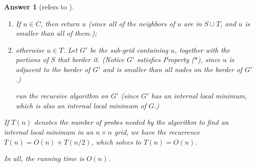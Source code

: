 \documentclass[11pt]{article}
\theoremstyle{numberplain}
\theoremstyle{nonumberplain}
\newtheorem{ans}{Answer}
\def\as{{\ast}}
\newcommand{\0}{{\mathbf{0}}}
\begin{document}
\begin{ans}[refers to \cite{solcornell}]
\begin{code}
\begin{enumerate}
\begin{enumerate}
(Notice that $u \not\in B$, since $v \in S \cup T$ and $v \prec B$.)
\item 
If $u \in C$, then return $u$ (since all of the neighbors of $u$ are in $S \cup T$, and $u$ is smaller than all of them.);
\item otherwise $u \in T$.
Let $G'$ be the sub-grid containing $u$, together
with the portions of $S$ that border it.
(Notice $G'$ satisfies Property ($\as$), since $u$ is adjacent to the border of $G'$ and is smaller than all nodes on the border of $G'$.)\par 
run the recursive algorithm on $G'$ (since $G'$ has an internal local minimum, which is also an internal local minimum of $G$.)
\end{enumerate}
If $T(n)$ denotes the number of probes needed by the algorithm to 
find an internal local minimum in an $n \times n$ grid, 
we have the recurrence $T(n) = O(n) + T(n/2)$, which solves to
$T(n) = O(n)$.
\end{enumerate}
\end{code}
In all, the running time is $O(n)$.
\end{ans}
\end{document}
